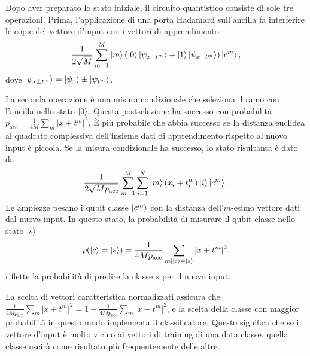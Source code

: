 Dopo aver preparato lo stato iniziale, il circuito quantistico 
consiste di sole tre operazioni. Prima, l'applicazione di 
una porta Hadamard sull'ancilla fa interferire le copie 
del vettore d'input con i vettori di apprendimento: 
\begin{equation}
    \frac{1}{2\sqrt{M}} \sum_{m=1}^M \ket{m}
    \left( \ket{0}\ket{\psi_{x+t^m}} + \ket{1}  
    \ket{\psi_{x-t^m}} \right) \ket{c^m},
\end{equation}
dove $\ket{\psi_{x \pm t^m}} = \ket{\psi_x} \pm \ket{\psi_{t^m}}$. 

La seconda operazione è una misura condizionale che seleziona 
il ramo con l'ancilla nello stato $\ket{0}$. Questa 
postselezione ha successo con probabilità 
$p_\text{acc} = \frac{1}{4M}\sum_m |x+t^m|^2$. 
È più probabile che abbia successo se la distanza euclidea 
al quadrato complessiva dell'insieme dati di apprendimento 
rispetto al nuovo input è piccola. 
Se la misura condizionale ha successo, lo stato risultanta 
è dato da 
\begin{equation}
    \frac{1}{2\sqrt{Mp_{\text{acc}}}} \sum_{m=1}^M \sum_{i=1}^N 
    \ket{m} ( x_i + t_i^m ) \ket{i} \ket{c^m}.
\end{equation}
Le ampiezze pesano i qubit classe $\ket{c^m}$ con la 
distanza dell'$m$-esimo vettore dati dal nuovo input. 
In questo stato, la probabilità di misurare il qubit 
classe nello stato $\ket{s}$ 
\begin{equation}
    p(\ket{c}=\ket{s}) = \frac{1}{4Mp_{\text{acc}}} 
    \sum_{m|\ket{c}=\ket{s}} |x+t^m|^2,
\end{equation}
riflette la probabilità di predire la classe $s$ per il 
nuovo input. 

La scelta di vettori caratteristica normalizzati assicura che \\ 
$\frac{1}{4Mp_{\text{acc}}}\sum_m |x+t^m|^2 = 
1 - \frac{1}{4Mp_{\text{acc}}}\sum_m |x-t^m|^2$, e la scelta 
della classe con maggior probabilità in questo modo 
implementa il classificatore. 
Questo significa che se il vettore d'input è molto 
vicino ai vettori di training di una data classe, 
quella classe uscirà come risultato più frequentemente 
delle altre. 


